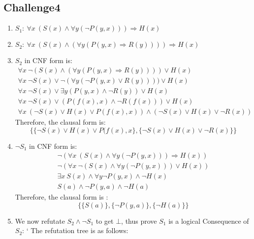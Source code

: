 \documentclass[11pt]{article}
\newcommand{\impl}{\mathbin{\Rightarrow}}
\begin{document}
\subsection*{Challenge4}
\begin{enumerate}
\item
$S_1:\ \forall x\ (S(x)\land \forall y (\neg P(y,x))) \impl H(x)$
\item
$S_2:\ \forall x\ (S(x) \land (\forall y (P(y,x) \impl R(y)))) \impl H(x)$
\item
$S_2$ in CNF form is:
\[
\begin{array}{lr}
    \forall x\ \neg(S(x) \land
    (\forall y (P(y,x) \impl R(y)))) \lor H(x)
\\  \forall x\ \neg S(x) \lor
    \neg(\forall y (\neg P(y,x) \lor R(y)))) \lor H(x)
\\  \forall x\ \neg S(x) \lor
    \exists y (P(y,x) \land \neg R(y))
    \lor H(x)
\\  \forall x\ \neg S(x) \lor
    (P(f(x),x) \land \neg R(f(x))) \lor
    H(x)
\\  \forall x\ 
    (\neg S(x) \lor H(x) \lor P(f(x),x)) \land
    (\neg S(x) \lor H(x) \lor \neg R(x))
\end{array}
\]
Therefore, the clausal form is:
\[
    \{\{\neg S(x) \lor H(x) \lor P(f(x),x\},
    \{\neg S(x) \lor H(x) \lor \neg R(x)\}\}
\]
\item
$\neg S_1$ in CNF form is:
\[
\begin{array}{lr}
    \neg (\forall x\ (S(x)\land \forall y (\neg P(y,x))) \impl H(x))
\\  \neg (\forall x\ \neg(S(x)\land \forall y (\neg P(y,x))) \lor H(x))
\\  \exists x\ S(x) \land \forall y \neg P(y,x) \land \neg H(x)
\\  S(a) \land \neg P(y,a) \land \neg H(a)
\end{array}
\]
Therefore, the clausal form is :
\[
    \{\{S(a)\},\{\neg P(y,a)\},\{\neg H(a)\}\}
\]
\item
We now refutate $S_2 \land \neg S_1$ to get $\bot$, thus prove $S_1$ is a logical Consequence of  $S_2$:
`
The refutation tree is as follows:
\begin{center}
\end{center}
\end{enumerate}
\end{document}
